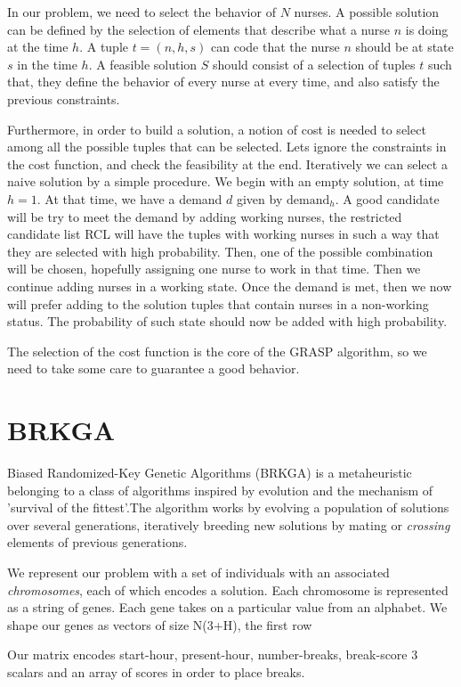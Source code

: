 \documentclass[12pt,a4paper]{article}
\begin{document}
In our problem, we need to select the behavior of $N$ nurses. A possible solution
can be defined by the selection of elements that describe what a nurse $n$ is
doing at the time $h$. A tuple $t = (n, h, s)$ can code that the nurse $n$
should be at state $s$ in the time $h$. A feasible solution $S$ should consist
of a selection of tuples $t$ such that, they define the behavior of every nurse
at every time, and also satisfy the previous constraints.

Furthermore, in order to build a solution, a notion of cost is needed to select
among all the possible tuples that can be selected. Lets ignore the constraints
in the cost function, and check the feasibility at the end. Iteratively we can
select a naive solution by a simple procedure. We begin with an empty solution,
at time $h = 1$. At that time, we have a demand $d$ given by
$\textrm{demand}_h$. A good candidate will be try to meet the demand by adding
working nurses, the restricted candidate list RCL will have the tuples with working nurses in such a way
that they are selected with high probability. Then, one of the possible
combination will be chosen, hopefully assigning one nurse to work in that time.
Then we continue adding nurses in a working state. Once the demand is met, then
we now will prefer adding to the solution tuples that contain nurses in a
non-working status. The probability of such state should now be added with high
probability.

The selection of the cost function is the core of the GRASP algorithm, so we
need to take some care to guarantee a good behavior.

\section{BRKGA}
%

Biased Randomized-Key Genetic Algorithms (BRKGA) is a metaheuristic belonging
to a class of algorithms inspired by evolution and the mechanism of 'survival of the fittest'.The
algorithm works by evolving a population of solutions over several generations, iteratively breeding new solutions
by mating or \textit{crossing} elements of previous generations.

We represent our problem with a set of individuals with an associated \textit{chromosomes}, each of which encodes
a solution.
Each chromosome is represented as a string of genes. Each gene takes on a particular value
from an alphabet. We shape our genes as vectors of size N\times(3+H), the first row

Our matrix encodes start-hour, present-hour, number-breaks, break-score
3 scalars and an array of scores in order to place breaks.

\end{document}
